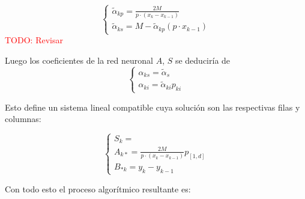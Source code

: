 \begin{equation}
    \left\{ 
        \begin{array}{l}
            \tilde{\alpha}_{k p} = \frac{2 M}{p \cdot (x_k - x_{k-1})}
            \\
            \tilde{\alpha}_{k s} = M -  \tilde{\alpha}_{k p}(p \cdot x_{k-1})
        \end{array}
    \right.
\end{equation}
\textcolor{red}{ TODO: Revisar}

Luego los coeficientes de la red neuronal $A$, $S$ se deduciría de 
\begin{equation}
    \left\{ 
        \begin{array}{l}
            \alpha_{k s} = \tilde{\alpha}_s \\
            \alpha_{k i} =  \tilde{\alpha}_{k i} p_{k i}
        \end{array}
        \right.
\end{equation}

Esto define un sistema lineal compatible
cuya solución son las respectivas filas y columnas: 

\begin{equation}
    \left\{ 
        \begin{array}{l}
            S_{k} = \\
            A_{k *} = \frac{2M}{ p \cdot ( x_k - x_{k-1} )} p_{[1,d]}\\
            B_{* k} = y_k - y_{k-1}
        \end{array}
    \right.
\end{equation}  

Con todo esto el proceso algorítmico resultante es: 


